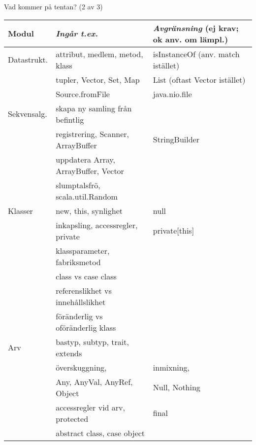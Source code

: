 \begin{Slide}{Vad kommer på tentan? (2 av 3)}\SlideFontTiny
\hspace{-2em}\begin{minipage}{1.0\textwidth}
\begin{tabular}{l | l | l}
\textbf{Modul} & \textit{Ingår t.ex.}& \textit{Avgränsning} (ej krav; ok anv. om lämpl.)\\\hline
Datastrukt. & attribut, medlem, metod, klass & isInstanceOf (anv. match istället) \\
            & tupler, Vector, Set, Map & List (oftast Vector istället)\\
            & Source.fromFile          & java.nio.file \\
\hline
Sekvensalg. &  skapa ny samling från befintlig &  \\      
            &  registrering, Scanner, ArrayBuffer & StringBuilder\\
            &  uppdatera Array, ArrayBuffer, Vector & \\
            &  slumptalsfrö, scala.util.Random  &  \\
\hline

Klasser     &  new, this, synlighet  & null \\
            &  inkapsling, accessregler, private  & private[this] \\
            &  klassparameter, fabriksmetod  & \\
            &  class vs case class    & \\
            &  referenslikhet vs innehållslikhet    & \\
            &  föränderlig vs oföränderlig klass & \\
\hline
Arv         &  bastyp, subtyp, trait, extends  & \\
            &  överskuggning,                  & inmixning, \\
            &  Any, AnyVal, AnyRef, Object     & Null, Nothing\\
            &  accessregler vid arv, protected & final\\
            &  abstract class, case object     & \\
            
\end{tabular}
\end{minipage}
\end{Slide}


